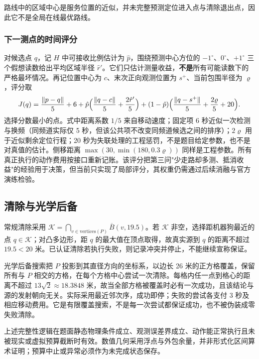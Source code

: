 路线中的区域中心是服务位置的近似，并未完整预测定位进入点与清除退出点，因此它不是全局在线最优路线。

\subsubsection{下一测点的时间评分}

对候选点 $q$，记 $H$ 中可接收比例估计为 $\hat p$，围绕预测中心方位的 $-1^\circ$、$0^\circ$、$+1^\circ$ 三个假想读数给出平均区域半径 $\hat r'$。它们只估计测量收益，\textbf{不是}所有可能读数下的严格最坏情况。再记位置中心为 $c$、末次正向观测位置为 $s^+$、当前包围半径为 $\varrho$，评分取
\begin{equation}
  J(q)=\frac{\lVert p-q\rVert}{5}+6
  +\hat p\Bigl(\frac{\lVert q-c\rVert}{5}+\frac{2\hat r'}{5}\Bigr)
  +(1-\hat p)\Bigl(\frac{\lVert q-s^+\rVert}{5}+\frac{2\varrho}{5}+20\Bigr).
  \label{eq:q4-score}
\end{equation}
选择分数最小的点。式中距离系数 $1/5$ 来自移动速度；固定项 6 秒近似一次检测与换频（同频道实际仅 5 秒，但该公共项不改变同频道候选之间的排序）；$2\varrho$ 用于近似剩余定位行程；20 秒为失联处理的工程惩罚，不是题目给定参数，也不是对真值的估计。侧移距离 $\max(30,\min(180,0.3\varrho))$ 同样是工程参数。所有真正执行的动作费用按接口重新记账。该评分把第三问"少走路却多测、抵消收益"的经验用于决策，但当前只实现了局部评分，其权重仍需通过后续消融与官方演练检验。

\subsection{清除与光学后备}

常规清除采用 $\mathcal{K}=\bigcap_{v\in\text{vertices}(P)}\overline{B}(v,19.5)$。若 $\mathcal{K}$ 非空，选择距机器狗最近的点 $q\in\mathcal{K}$；对凸多边形，距 $q$ 的最大值在顶点取得，故真实源到 $q$ 的距离不超过 $19.5<20$ 米。已认证清除若执行失败，则记录冲突并停止，不能继续宣称保证。

光学后备搜索把 $P$ 投影到其直径方向的坐标系，以边长 26 米的正方格覆盖，保留所有与 $P$ 相交的方格，在每个方格中心尝试一次清除。每格内任一点到格心的距离不超过 $13\sqrt2\approx18.3848$ 米，故当全部方格被覆盖时必有一次成功，且该结论与源的发射朝向无关。实际采用最近邻次序，成功即停；失败的尝试各支付 3 秒及相应移动费用。它是有限覆盖搜索，不是每一次尝试都保证成功，也不被伪装成零失败清除。

上述完整性逻辑在题面静态物理条件成立、观测误差界成立、动作能正常执行且未被现实或虚拟预算截断时有效。数值几何采用浮点与外包余量，并非形式化区间算术证明；预算中止或异常必须作为未完成状态保存。

